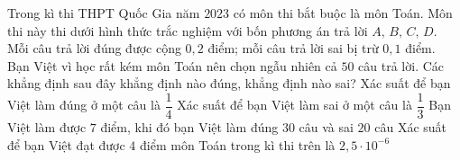 \begin{ex}%
 Trong kì thi THPT Quốc Gia năm $2023$ có môn thi bắt buộc  là môn Toán. Môn thi này thi dưới hình thức trắc nghiệm với bốn phương án trả lời $A,\,B,\,C,\,D$. Mỗi câu trả lời đúng được cộng $0{,}2$ điểm; mỗi câu trả lời sai bị trừ $0{,}1$ điểm. Bạn Việt vì học rất kém môn Toán nên chọn ngẫu nhiên cả $50$ câu trả lời. Các khẳng định sau đây khẳng định nào đúng, khẳng định nào sai?
 \choiceTF 
  {\True Xác  suất để bạn Việt làm đúng ở một câu là $\dfrac{1}{4}$}
  {Xác suất để bạn Việt làm sai  ở một câu là $\dfrac{1}{3}$}
  {Bạn Việt làm được $7$ điểm, khi  đó bạn Việt làm đúng $30$ câu và sai $20$ câu}
  {Xác suất để bạn Việt đạt được $4$ điểm môn Toán trong  kì thi trên là $2{,}5\cdot10^{-6}$}
\end{ex}

